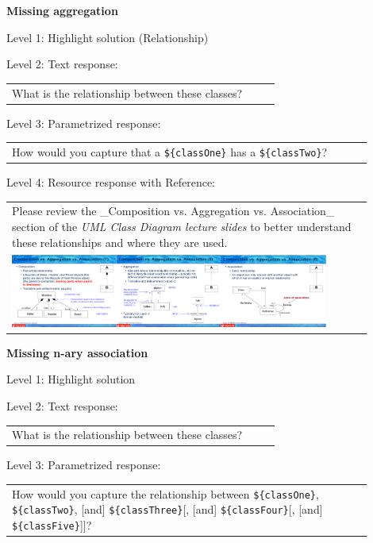 \noindent \textbf{Missing aggregation} \medskip

\noindent Level 1: Highlight solution (Relationship) \medskip

\noindent Level 2: Text response: \medskip

\begin{tabular}{|p{0.9\linewidth}}
What is the relationship between these classes?
\end{tabular} \medskip

\noindent Level 3: Parametrized response: \medskip

\begin{tabular}{|p{0.9\linewidth}}
How would you capture that a \verb|${classOne}| has a \verb|${classTwo}|?
\end{tabular} \medskip

\noindent Level 4: Resource response with Reference: \medskip

\begin{tabular}{|p{0.9\linewidth}}
Please review the _Composition vs. Aggregation vs. Association_ section of 
the \textit{UML Class Diagram lecture slides} to 
better understand these relationships and where they are used.

\\
\includegraphics[width=0.9\textwidth]{images/composition_aggregation_association.png}
\end{tabular} \medskip


\noindent \textbf{Missing n-ary association} \medskip

\noindent Level 1: Highlight solution  \medskip

\noindent Level 2: Text response: \medskip

\begin{tabular}{|p{0.9\linewidth}}
What is the relationship between these classes?
\end{tabular} \medskip

\noindent Level 3: Parametrized response: \medskip

\begin{tabular}{|p{0.9\linewidth}}
How would you capture the relationship between \verb|${classOne}|, \verb|${classTwo}|, [and] \verb|${classThree}|[, [and] \verb|${classFour}|[, [and] \verb|${classFive}|]]?
\end{tabular} \medskip

